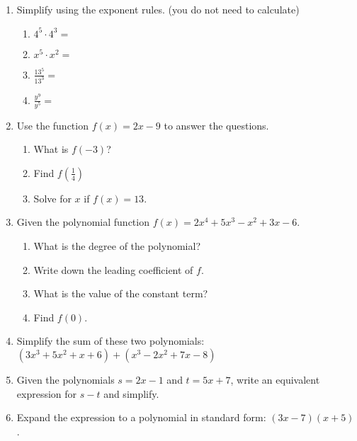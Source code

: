 \documentclass[12pt, twoside]{article}
\begin{document}
\begin{enumerate}[itemsep=0.5cm]
\item Simplify using the exponent rules. (you do not need to calculate)
  \begin{multicols}{2}
  \begin{enumerate}[itemsep=0.5cm]
      \item $4^5 \cdot 4^3 = $      
      \item $x^5 \cdot x^2 = $      
      \item $\displaystyle \frac{13^5}{13^3} = $
      \item $\displaystyle \frac{y^9}{y^5} = $
  \end{enumerate}
  \end{multicols}

\item Use the function $f(x) = 2x-9$ to answer the questions.
\begin{multicols}{2}
\begin{enumerate}[itemsep=2cm]
    \item What is $f(-3)$?
    \item Find $f(\frac{1}{4})$
    \item Solve for $x$ if $f(x) = 13$.
\end{enumerate}
\end{multicols} \vspace{1cm}

\newpage
\item Given the polynomial function $f(x)=2x^4+5x^3-x^2+3x-6$. 
\begin{enumerate}[itemsep=0.2cm]
    \item What is the degree of the polynomial?
    \item Write down the leading coefficient of $f$.
    \item What is the value of the constant term?
    \item Find $f(0)$.
\end{enumerate}

\item Simplify the sum of these two polynomials: $(3x^3+5x^2+x+6)+(x^3-2x^2+7x-8)$ \vspace{3cm}

\item Given the polynomials $s = 2x - 1 $ and $t = 5x + 7$, write an equivalent expression for $s-t $ and simplify. \vspace{2cm}

\item Expand the expression to a polynomial in standard form: $(3x-7)(x+5)$. \vspace{3cm}


\end{enumerate}
\end{document}
